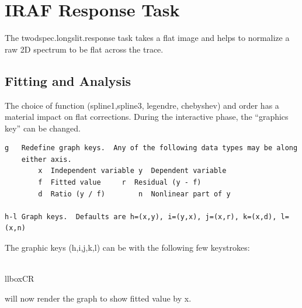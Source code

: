 \renewcommand{\footerfilename}{ResponseTask.tex}

\section{IRAF Response Task}

The twodspec.longslit.response task  takes a flat
image and helps to normalize a raw 2D spectrum to be flat across the trace.



\subsection{Fitting and Analysis}

The choice of function (spline1,spline3, legendre, chebyshev) and order has
a material impact on flat corrections. During the interactive phase,
the ``graphics key'' can be changed.

\begingroup \fontsize{10pt}{10pt}
\selectfont
{\color{deered}
\begin{verbatim} 
g	Redefine graph keys.  Any of the following data types may be along
	either axis.
	    x  Independent variable	y  Dependent variable
	    f  Fitted value		r  Residual (y - f)
	    d  Ratio (y / f)		n  Nonlinear part of y

h-l	Graph keys.  Defaults are h=(x,y), i=(y,x), j=(x,r), k=(x,d), l=(x,n)
\end{verbatim}
}
\endgroup

The graphic keys (h,i,j,k,l) can be  with the following
few keystrokes:

    \llbox{,}  \\llbox{CR}

will now render the graph to show fitted value by x.


